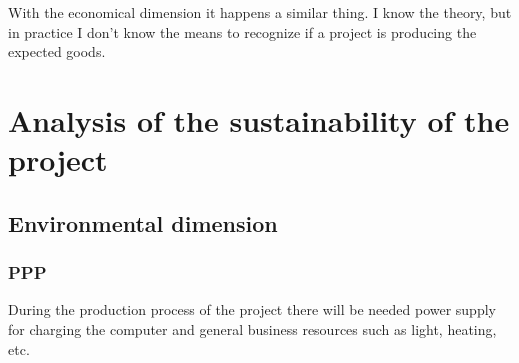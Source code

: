 \documentclass[a4paper]{article}
\begin{document}
With the economical dimension it happens a similar thing. I know the theory, but in practice I don't know the means to recognize if a project is producing the expected goods.

%
%
%
%
%




    \section{Analysis of the sustainability of the project}
        \subsection{Environmental dimension}
            \subsubsection{PPP}

            During the production process of the project there will be needed power supply for charging the computer and general business resources such as light, heating, etc.
\end{document}
